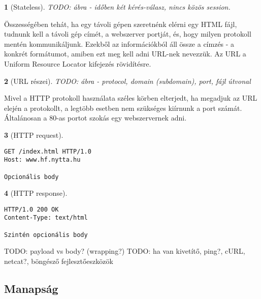 \documentclass[a4paper, 12pt, oneside]{article}
\newtheorem*{defin}{}
\begin{document}
\begin{center}
\begin{defin}[Stateless]
TODO: ábra - időben két kérés-válasz, nincs közös session.
\end{defin}
\end{center}

Összességében tehát, ha egy távoli gépen szeretnénk elérni egy HTML fájl, tudnunk kell a távoli gép címét, a webszerver portját, és, hogy milyen protokoll mentén kommunikáljunk. Ezekből az információkból áll össze a címzés - a konkrét formátumot, amiben ezt meg kell adni URL-nek nevezzük. Az URL a Uniform Resource Locator kifejezés rövidítésre.

\begin{center}
\begin{defin}[URL részei]
TODO: ábra - protocol, domain (subdomain), port, fájl útvonal
\end{defin}
\end{center}

Mivel a HTTP protokoll használata széles körben elterjedt, ha megadjuk az URL elején a protokollt, a legtöbb esetben nem szükséges kiírnunk a port számát. Általánosan a 80-as portot szokás egy webszervernek adni.


\begin{center}
\begin{defin}[HTTP request]
\end{defin}
\end{center}

\begin{verbatim}
GET /index.html HTTP/1.0
Host: www.hf.nytta.hu

Opcionális body
\end{verbatim}

\begin{center}
\begin{defin}[HTTP response]
\end{defin}
\end{center}

\begin{verbatim}
HTTP/1.0 200 OK
Content-Type: text/html

Szintén opcionális body
\end{verbatim}


TODO: payload vs body? (wrapping?)
TODO: ha van kivetítő, ping?, cURL, netcat?, böngésző fejlesztőeszközök


\subsection*{Manapság}
\end{document}
